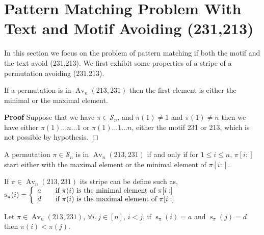 \documentclass[a4paper]{llncs}
\DeclareMathOperator{\Avd}{Av}
\newcommand\Av[2]{\Avd_{{#1}}({#2})}
\newcommand{\Perm}[1]{\mathcal{S}_{#1}}
\DeclareMathOperator{\stripea}{s}
\newcommand{\stripe}[2]{\stripea_{{#1}}({#2})}
\newcounter{num}
\newcommand{\numl}[1]{\refstepcounter{num}\label{#1}}
\newcommand{\dstep}{d}
\newcommand{\ustep}{a}
\begin{document}
	\section{Pattern Matching Problem With Text and Motif Avoiding (231,213)}

		In this section we focus 
		on the problem of pattern matching if
		both the motif and the text
		avoid (231,213).
		We first exhibit some properties of a stripe 
		of a permutation avoiding (231,213).\\

		\begin{lemma}
		\label{lemma:firstelement}
		If a permutation is in $\Av{n}{213,231}$ 
		then the first element is either
		the minimal or the maximal element.
		\end{lemma}

		
		\textbf{Proof} Suppose that we have
		$\pi \in \mathcal{S}_{n}$, and
		$\pi(1) \neq 1 $ and $\pi(1) \neq n$ then we have either
		$\pi(1) ... n ... 1$ or $\pi(1) ... 1 ... n $, either the motif 231 or 213, which is not possible by hypothesis. $\Box$\\

		\begin{corollary}
		\label{corollary:stripe}
		A permutation $\pi \in \Perm{n}$ is in $\Av{n}{213,231}$ if and only if for $1 \leq i \leq n$, 
		$\pi[i:]$ start either with the maximal element
		or the minimal element of $\pi[i:]$.
		\end{corollary}
		

		\begin{corollary}
		If $\pi \in \Av{n}{213,231}$ its stripe can be define such as, \\
		$\stripe{\pi}{i} = \left\{ 
  		\begin{array}{l l}
   			\ustep & \quad \text{if $\pi(i)$ is the minimal element of $\pi[i:]$}\\    
   			\dstep & \quad \text{if $\pi(i)$ is the maximal element of $\pi[i:]$}\\
	 	\end{array} \right. 
	 	$
		\end{corollary}

		\begin{lemma}
		\label{lemma:updown}
		Let $\pi \in \Av{n}{213,231}$,
		$\forall i,j \in [n]$, 
		$i<j$, 
		if $\stripe{\pi}{i}=\ustep$
		and $\stripe{\pi}{j}=\dstep$
		then $\pi(i)<\pi(j)$.
		\end{lemma}
	 	
\end{document}
